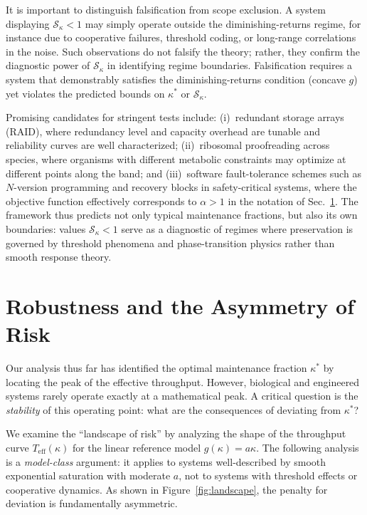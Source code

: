 \documentclass[11pt,twocolumn]{article}
\begin{document}
It is important to distinguish falsification from scope exclusion. A system displaying $\mathcal{S}_\kappa < 1$ may simply operate outside the diminishing-returns regime, for instance due to cooperative failures, threshold coding, or long-range correlations in the noise. Such observations do not falsify the theory; rather, they confirm the diagnostic power of $\mathcal{S}_\kappa$ in identifying regime boundaries. Falsification requires a system that demonstrably satisfies the diminishing-returns condition (concave $g$) yet violates the predicted bounds on $\kappa^*$ or $\mathcal{S}_\kappa$.

Promising candidates for stringent tests include:
(i)~redundant storage arrays (RAID), where redundancy level and capacity overhead are tunable and reliability curves are well characterized;
(ii)~ribosomal proofreading across species, where organisms with different metabolic constraints may optimize at different points along the band; and
(iii)~software fault-tolerance schemes such as $N$-version programming and recovery blocks in safety-critical systems, where the objective function effectively corresponds to $\alpha > 1$ in the notation of Sec.~\ref{sec:robustness}.
The framework thus predicts not only typical maintenance fractions, but also its own boundaries: values $\mathcal{S}_\kappa < 1$ serve as a diagnostic of regimes where preservation is governed by threshold phenomena and phase-transition physics rather than smooth response theory.

\section{Robustness and the Asymmetry of Risk}
\label{sec:robustness}

Our analysis thus far has identified the optimal maintenance fraction $\kappa^*$ by locating the peak of the effective throughput. However, biological and engineered systems rarely operate exactly at a mathematical peak. A critical question is the \emph{stability} of this operating point: what are the consequences of deviating from $\kappa^*$?

We examine the ``landscape of risk'' by analyzing the shape of the throughput curve $T_{\mathrm{eff}}(\kappa)$ for the linear reference model $g(\kappa) = a\kappa$. The following analysis is a \emph{model-class} argument: it applies to systems well-described by smooth exponential saturation with moderate $a$, not to systems with threshold effects or cooperative dynamics. As shown in Figure~\ref{fig:landscape}, the penalty for deviation is fundamentally asymmetric.
\end{document}
